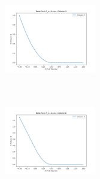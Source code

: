 \documentclass[UTF8]{ctexart}
\begin{document}
\noindent %
\begin{minipage}{0.3\textwidth}
	\includegraphics[width=4cm, height=4cm, keepaspectratio]{../figure/F_n=2.csv_Column_3.png} %
\end{minipage}
\hspace{0.5em} %
\begin{minipage}{0.3\textwidth}
	\includegraphics[width=4cm, height=4cm, keepaspectratio]{../figure/F_n=2.csv_Column_6.png} %
\end{minipage}

\vspace{0.5em} %
\end{document}
